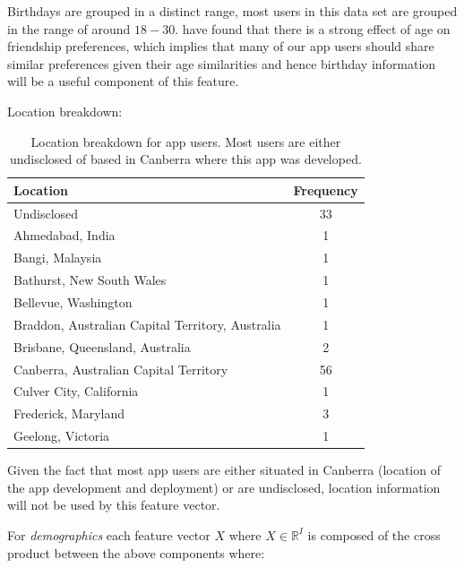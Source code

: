 Birthdays are grouped in a distinct range, most users in this data set are grouped in the range of around $18 - 30$. 
\cite{jugand} have found that there is a strong effect of age on friendship preferences, which implies that many of our app users 
should share similar preferences given their age similarities and hence birthday information will be a useful component of this feature.

\clearpage

Location breakdown:

\begin{table}[!htbp]
\centering
	\begin{tabular}{|l|c|} %
		\hline
		\textbf{Location} & \textbf{Frequency}  \\ \hline
		Undisclosed & 33 \\ \hline
		Ahmedabad, India & 1 \\ \hline
		Bangi, Malaysia & 1 \\ \hline
		Bathurst, New South Wales & 1 \\ \hline
		Bellevue, Washington & 1 \\ \hline
		Braddon, Australian Capital Territory, Australia & 1 \\ \hline
		Brisbane, Queensland, Australia & 2 \\ \hline
		Canberra, Australian Capital Territory & 56 \\ \hline
		Culver City, California & 1 \\ \hline
		Frederick, Maryland & 3 \\ \hline
		Geelong, Victoria & 1 \\ \hline
	\end{tabular}
	\caption{Location breakdown for app users. Most users are either undisclosed of based in Canberra where this app was developed.}
	\label{tab:revpol}
\end{table}

Given the fact that most app users are either situated in Canberra (location of the app development and deployment) or are undisclosed, 
location information will not be used by this feature vector.

For \emph{demographics} each feature vector $X$ where $X \in \mathbb{R}^I$ is composed of the cross product between the above components where:

